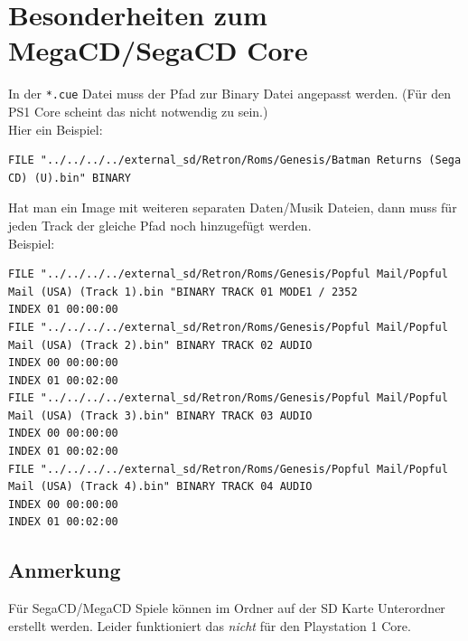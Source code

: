 \documentclass[a4paper]{article}
\begin{document}
\section{Besonderheiten zum MegaCD/SegaCD Core}

In der \texttt{*.cue} Datei muss der Pfad zur Binary Datei angepasst werden. (F\"ur den PS1 Core scheint das nicht notwendig zu sein.) \\
Hier ein Beispiel: \\
\begin{lstlisting}[breaklines]
FILE "../../../../external_sd/Retron/Roms/Genesis/Batman Returns (Sega CD) (U).bin" BINARY
\end{lstlisting}

Hat man ein Image mit weiteren separaten Daten/Musik Dateien, dann muss f\"ur jeden Track der gleiche Pfad noch hinzugef\"ugt werden. \\
Beispiel: \\
\begin{lstlisting}[breaklines=true]
FILE "../../../../external_sd/Retron/Roms/Genesis/Popful Mail/Popful Mail (USA) (Track 1).bin "BINARY TRACK 01 MODE1 / 2352
INDEX 01 00:00:00
FILE "../../../../external_sd/Retron/Roms/Genesis/Popful Mail/Popful Mail (USA) (Track 2).bin" BINARY TRACK 02 AUDIO
INDEX 00 00:00:00
INDEX 01 00:02:00
FILE "../../../../external_sd/Retron/Roms/Genesis/Popful Mail/Popful Mail (USA) (Track 3).bin" BINARY TRACK 03 AUDIO
INDEX 00 00:00:00
INDEX 01 00:02:00
FILE "../../../../external_sd/Retron/Roms/Genesis/Popful Mail/Popful Mail (USA) (Track 4).bin" BINARY TRACK 04 AUDIO
INDEX 00 00:00:00
INDEX 01 00:02:00
\end{lstlisting}

\subsection{Anmerkung}

F\"ur SegaCD/MegaCD Spiele k\"onnen im  Ordner auf der SD Karte Unterordner erstellt werden. Leider funktioniert das \emph{nicht} f\"ur den Playstation 1 Core.


\listoftodos[To-Do]

\printbibliography
\end{document}
